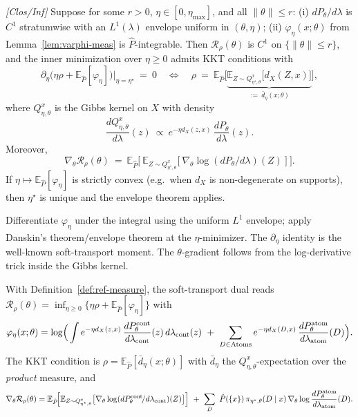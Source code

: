 \begin{proposition}\label{prop:kkt}
\emph{[\textup{Clos/Inf}]} Suppose for some $r>0$, $\eta\in[0,\eta_{\max}]$, and all $\|\theta\|\le r$:
(i) $dP_\theta/d\lambda$ is $C^1$ stratumwise with an $L^1(\lambda)$ envelope uniform in $(\theta,\eta)$;
(ii) $\varphi_\eta(x;\theta)$ from Lemma~\ref{lem:varphi-meas} is $\hat P$-integrable.
Then $\mathcal R_\rho(\theta)$ is $C^1$ on $\{\|\theta\|\le r\}$, and the inner minimization over $\eta\ge 0$ admits KKT conditions with
\[
\partial_\eta \Big(\eta\rho+\mathbb E_{\hat P}[\varphi_\eta]\Big)\bigg|_{\eta=\eta^\star}\ =\ 0
\quad\Longleftrightarrow\quad
\rho\ =\ \mathbb E_{\hat P}\Big[\underbrace{\mathbb E_{Z\sim Q_{\eta^\star,\theta}^x}\big[d_X(Z,x)\big]}_{:=\ \bar d_\eta(x;\theta)}\Big],
\]
where $Q_{\eta,\theta}^x$ is the Gibbs kernel on $X$ with density
\[
\frac{dQ_{\eta,\theta}^x}{d\lambda}(z)\ \propto\ e^{-\eta d_X(z,x)}\,\frac{dP_\theta}{d\lambda}(z).
\]
Moreover,
\[
\nabla_\theta \mathcal R_\rho(\theta)\ =\ \mathbb E_{\hat P}\Big[\ \mathbb E_{Z\sim Q_{\eta^\star,\theta}^x}\big[\ \nabla_\theta \log (dP_\theta/d\lambda)(Z)\ \big]\ \Big].
\]
If $\eta\mapsto \mathbb E_{\hat P}[\varphi_\eta]$ is strictly convex (e.g.\ when $d_X$ is non-degenerate on supports), then $\eta^\star$ is unique and the envelope theorem applies.
\begin{proofsketch}
Differentiate $\varphi_\eta$ under the integral using the uniform $L^1$ envelope; apply Danskin's theorem/envelope theorem at the $\eta$-minimizer. The $\partial_\eta$ identity is the well-known soft-transport moment. The $\theta$-gradient follows from the log-derivative trick inside the Gibbs kernel.
\end{proofsketch}
\end{proposition}

\begin{corollary}\label{cor:kkt-mixed}
With Definition~\ref{def:ref-measure}, the soft-transport dual reads
$\mathcal R_\rho(\theta)=\inf_{\eta\ge0}\{\eta\rho+\mathbb E_{\hat P}[\varphi_\eta]\}$ with
\[
\varphi_\eta(x;\theta)=\log\!\Big(\int e^{-\eta d_X(z,x)}\,\frac{dP^{\cont}_\theta}{d\lambda_{\cont}}(z)\,d\lambda_{\cont}(z)\ +\ \sum_{D\in\mathrm{Atoms}} e^{-\eta d_X(D,x)}\,\frac{dP^{\atom}_\theta}{d\lambda_{\atom}}(D)\Big).
\]
The KKT condition is $\rho=\mathbb E_{\hat P}[\bar d_\eta(x;\theta)]$ with $\bar d_\eta$ the $Q^{x}_{\eta,\theta}$-expectation over the \emph{product} measure, and
\[
\nabla_\theta \mathcal R_\rho(\theta)=\mathbb E_{\hat P}\!\Big[\mathbb E_{Z\sim Q^{x}_{\eta^\star,\theta}}\big[\nabla_\theta\log(dP^{\cont}_\theta\!/d\lambda_{\cont})(Z)\big]\Big]\ +\ \sum_{D}\ \hat P(\{x\})\,\pi_{\eta^\star,\theta}(D\mid x)\,\nabla_\theta\log\frac{dP^\atom_\theta}{d\lambda_{\atom}}(D).
\]
\end{corollary}

